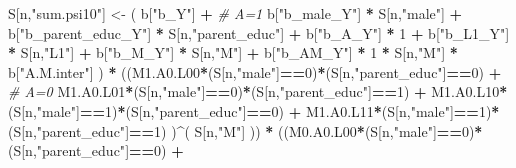 \documentclass[
]{book}
\newenvironment{Shaded}{\begin{snugshade}}{\end{snugshade}}
\newcommand{\CommentTok}[1]{\textcolor[rgb]{0.56,0.35,0.01}{\textit{#1}}}
\newcommand{\DecValTok}[1]{\textcolor[rgb]{0.00,0.00,0.81}{#1}}
\newcommand{\NormalTok}[1]{#1}
\newcommand{\OtherTok}[1]{\textcolor[rgb]{0.56,0.35,0.01}{#1}}
\newcommand{\SpecialCharTok}[1]{\textcolor[rgb]{0.81,0.36,0.00}{\textbf{#1}}}
\newcommand{\StringTok}[1]{\textcolor[rgb]{0.31,0.60,0.02}{#1}}
\begin{document}
\begin{Shaded}
\begin{Highlighting}[]
\NormalTok{    S[n,}\StringTok{"sum.psi10"}\NormalTok{] }\OtherTok{\textless{}{-}}\NormalTok{  ( b[}\StringTok{"b\_Y"}\NormalTok{] }\SpecialCharTok{+}                                           \CommentTok{\# A=1}
\NormalTok{                             b[}\StringTok{"b\_male\_Y"}\NormalTok{] }\SpecialCharTok{*}\NormalTok{ S[n,}\StringTok{"male"}\NormalTok{] }\SpecialCharTok{+} 
\NormalTok{                             b[}\StringTok{"b\_parent\_educ\_Y"}\NormalTok{] }\SpecialCharTok{*}\NormalTok{ S[n,}\StringTok{"parent\_educ"}\NormalTok{] }\SpecialCharTok{+} 
\NormalTok{                             b[}\StringTok{"b\_A\_Y"}\NormalTok{] }\SpecialCharTok{*} \DecValTok{1} \SpecialCharTok{+} 
\NormalTok{                             b[}\StringTok{"b\_L1\_Y"}\NormalTok{] }\SpecialCharTok{*}\NormalTok{ S[n,}\StringTok{"L1"}\NormalTok{] }\SpecialCharTok{+}
\NormalTok{                             b[}\StringTok{"b\_M\_Y"}\NormalTok{] }\SpecialCharTok{*}\NormalTok{ S[n,}\StringTok{"M"}\NormalTok{] }\SpecialCharTok{+}
\NormalTok{                             b[}\StringTok{"b\_AM\_Y"}\NormalTok{] }\SpecialCharTok{*} \DecValTok{1} \SpecialCharTok{*}\NormalTok{ S[n,}\StringTok{"M"}\NormalTok{] }\SpecialCharTok{*}\NormalTok{ b[}\StringTok{"A.M.inter"}\NormalTok{] ) }\SpecialCharTok{*}
\NormalTok{      ((M1.A0.L00}\SpecialCharTok{*}\NormalTok{(S[n,}\StringTok{"male"}\NormalTok{]}\SpecialCharTok{==}\DecValTok{0}\NormalTok{)}\SpecialCharTok{*}\NormalTok{(S[n,}\StringTok{"parent\_educ"}\NormalTok{]}\SpecialCharTok{==}\DecValTok{0}\NormalTok{) }\SpecialCharTok{+}                    \CommentTok{\# A\textquotesingle{}=0}
\NormalTok{          M1.A0.L01}\SpecialCharTok{*}\NormalTok{(S[n,}\StringTok{"male"}\NormalTok{]}\SpecialCharTok{==}\DecValTok{0}\NormalTok{)}\SpecialCharTok{*}\NormalTok{(S[n,}\StringTok{"parent\_educ"}\NormalTok{]}\SpecialCharTok{==}\DecValTok{1}\NormalTok{) }\SpecialCharTok{+}
\NormalTok{          M1.A0.L10}\SpecialCharTok{*}\NormalTok{(S[n,}\StringTok{"male"}\NormalTok{]}\SpecialCharTok{==}\DecValTok{1}\NormalTok{)}\SpecialCharTok{*}\NormalTok{(S[n,}\StringTok{"parent\_educ"}\NormalTok{]}\SpecialCharTok{==}\DecValTok{0}\NormalTok{) }\SpecialCharTok{+} 
\NormalTok{          M1.A0.L11}\SpecialCharTok{*}\NormalTok{(S[n,}\StringTok{"male"}\NormalTok{]}\SpecialCharTok{==}\DecValTok{1}\NormalTok{)}\SpecialCharTok{*}\NormalTok{(S[n,}\StringTok{"parent\_educ"}\NormalTok{]}\SpecialCharTok{==}\DecValTok{1}\NormalTok{) )}\SpecialCharTok{\^{}}\NormalTok{( S[n,}\StringTok{"M"}\NormalTok{] )) }\SpecialCharTok{*}
\NormalTok{      ((M0.A0.L00}\SpecialCharTok{*}\NormalTok{(S[n,}\StringTok{"male"}\NormalTok{]}\SpecialCharTok{==}\DecValTok{0}\NormalTok{)}\SpecialCharTok{*}\NormalTok{(S[n,}\StringTok{"parent\_educ"}\NormalTok{]}\SpecialCharTok{==}\DecValTok{0}\NormalTok{) }\SpecialCharTok{+}                

\end{Highlighting}
\end{Shaded}
\end{document}
